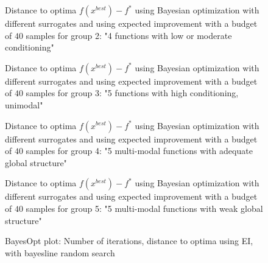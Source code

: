 \begin{figure}[h]
    \centering
    
    \caption{Distance to optima $f(x^{best})-f^*$ using Bayesian optimization with different surrogates
    and using expected improvement with a budget of $40$ samples for group 2: "4 functions with low or moderate conditioning"}
\end{figure}
\begin{figure}[h]
    \centering
    
    \caption{Distance to optima $f(x^{best})-f^*$ using Bayesian optimization with different surrogates
    and using expected improvement with a budget of $40$ samples for group 3: "5 functions with high conditioning, unimodal"}
\end{figure}
\begin{figure}[h]
    \centering
    
    \caption{Distance to optima $f(x^{best})-f^*$ using Bayesian optimization with different surrogates
    and using expected improvement with a budget of $40$ samples for group 4: "5 multi-modal functions with adequate global structure"}
\end{figure}
\begin{figure}[h]
    \centering
    
    \caption{Distance to optima $f(x^{best})-f^*$ using Bayesian optimization with different surrogates
    and using expected improvement with a budget of $40$ samples for group 5: "5 multi-modal functions with weak global structure"}
\end{figure}

\begin{figure}[h]
    \centering
    \caption{BayesOpt plot: Number of iterations, distance to optima using EI, with bayesline random search}
\end{figure}


